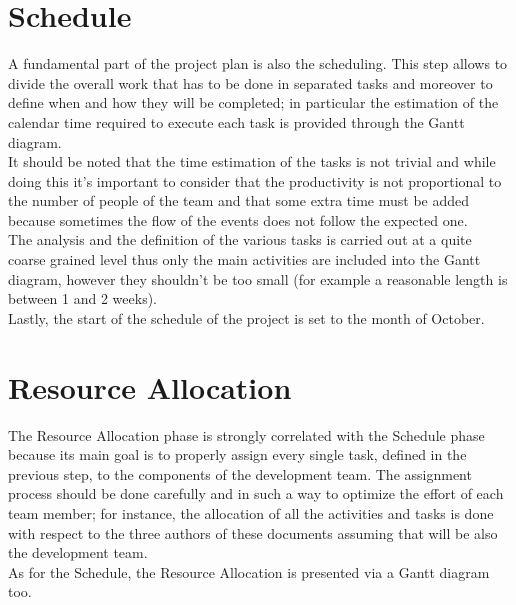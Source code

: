 \documentclass[11pt,a4paper]{report}
\begin{document}
\chapter{Schedule}
A fundamental part of the project plan is also the scheduling. This step allows to divide the overall work that has to be done in separated tasks and moreover to define when and how they will be completed; in particular the estimation of the calendar time required to execute each task is provided through the Gantt diagram.\\
It should be noted that the time estimation of the tasks is not trivial and while doing this it's important to consider that the productivity is not proportional to the number of people of the team and that some extra time must be added because sometimes the flow of the events does not follow the expected one.\\
The analysis and the definition of the various tasks is carried out at a quite coarse grained level thus only the main activities are included into the Gantt diagram, however they shouldn't be too small (for example a reasonable length is between 1 and 2 weeks).\\
Lastly, the start of the schedule of the project is set to the month of October.\\
\chapter{Resource Allocation}
The Resource Allocation phase is strongly correlated with the Schedule phase because its main goal is to properly assign every single task, defined in the previous step, to the components of the development team.
The assignment process should be done carefully and in such a way to optimize the effort of each team member; for instance, the allocation of all the activities and tasks is done with respect to the three authors of these documents assuming that will be also the development team.\\
As for the Schedule, the Resource Allocation is presented via a Gantt diagram too.\\
\end{document}
